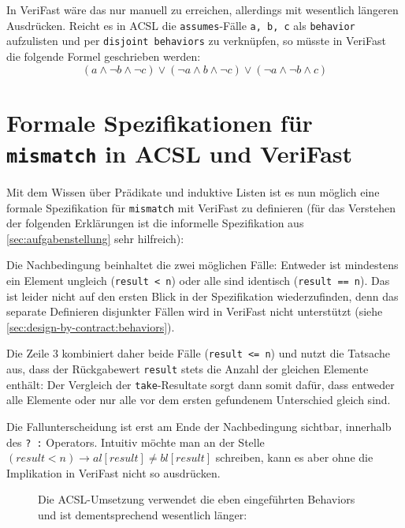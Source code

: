 In VeriFast wäre das nur manuell zu erreichen, allerdings mit wesentlich längeren Ausdrücken. Reicht 
es in ACSL die \lstinline{assumes}-Fälle \lstinline{a, b, c} als \lstinline{behavior} 
aufzulisten und per \lstinline{disjoint behaviors} zu verknüpfen, so müsste in VeriFast die folgende
Formel geschrieben werden:
\[(a \land \neg b \land \neg c) \lor (\neg a \land b \land \neg c) \lor (\neg a \land \neg b \land c)\]


\section{Formale Spezifikationen für \texttt{mismatch} in ACSL und VeriFast}

Mit dem Wissen über Prädikate und induktive Listen ist es nun möglich eine formale Spezifikation für \lstinline{mismatch} mit VeriFast
zu definieren (für das Verstehen der folgenden Erklärungen ist die informelle Spezifikation aus 
\ref{sec:aufgabenstellung} sehr hilfreich):



Die Nachbedingung beinhaltet die zwei möglichen Fälle: Entweder ist mindestens ein Element ungleich
(\lstinline{result < n}) oder alle sind identisch (\lstinline{result == n}). Das ist leider nicht auf den
ersten Blick in der Spezifikation wiederzufinden, denn das separate Definieren disjunkter Fällen wird in VeriFast 
nicht unterstützt (siehe \ref{sec:design-by-contract:behaviors}). 

Die Zeile 3 kombiniert daher beide Fälle (\lstinline{result <= n}) und nutzt die Tatsache aus, dass
der Rückgabewert \lstinline{result} stets die Anzahl der gleichen Elemente enthält: Der Vergleich der
\lstinline{take}-Resultate sorgt dann somit dafür, dass entweder alle Elemente oder nur
alle vor dem ersten gefundenem Unterschied gleich sind. 

Die Fallunterscheidung ist erst am Ende der Nachbedingung sichtbar, innerhalb des \lstinline{? :} Operators.
Intuitiv möchte man an der Stelle \((result < n) \rightarrow al[result] \neq  bl[result]\)
schreiben, kann es aber ohne die Implikation in VeriFast nicht so ausdrücken.

\begin{figure}[H]
Die ACSL-Umsetzung verwendet die eben eingeführten Behaviors und ist dementsprechend wesentlich länger:

\end{figure}

